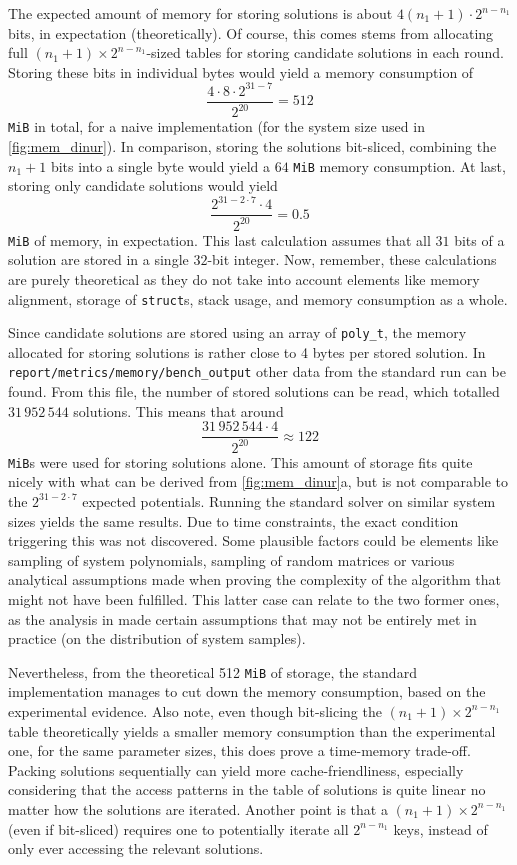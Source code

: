The expected amount of memory for storing solutions is about $4(n_1 + 1) \cdot 2^{n - n_1}$ bits, in expectation (theoretically). Of course, this comes stems from allocating full $(n_1 + 1) \times 2^{n - n_1}$-sized tables for storing candidate solutions in each round. Storing these bits in individual bytes would yield a memory consumption of 
$$
    \frac{4 \cdot 8 \cdot 2^{31 - 7}}{2^{20}} = 512
$$
\texttt{MiB} in total, for a naive implementation (for the system size used in \cref{fig:mem_dinur}). In comparison, storing the solutions bit-sliced, combining the $n_1 + 1$ bits into a single byte would yield a $64$ \texttt{MiB} memory consumption. At last, storing only candidate solutions would yield
$$
    \frac{2^{31 - 2 \cdot 7} \cdot 4}{2^{20}} = 0.5
$$
\texttt{MiB} of memory, in expectation. This last calculation assumes that all $31$ bits of a solution are stored in a single $32$-bit integer. Now, remember, these calculations are purely theoretical as they do not take into account elements like memory alignment, storage of \texttt{struct}s, stack usage, and memory consumption as a whole.

Since candidate solutions are stored using an array of \texttt{poly\_t}, the memory allocated for storing solutions is rather close to 4 bytes per stored solution. In \texttt{report/metrics/memory/bench\_output} other data from the standard run can be found. From this file, the number of stored solutions can be read, which totalled $31\,952\,544$ solutions. This means that around
$$
    \frac{31\,952\,544 \cdot 4}{2^{20}} \approx 122
$$
\texttt{MiB}s were used for storing solutions alone. This amount of storage fits quite nicely with what can be derived from \cref{fig:mem_dinur}a, but is not comparable to the $2^{31 - 2 \cdot 7}$ expected potentials. Running the standard solver on similar system sizes yields the same results. Due to time constraints, the exact condition triggering this was not discovered. Some plausible factors could be elements like sampling of system polynomials, sampling of random matrices or various analytical assumptions made when proving the complexity of the algorithm that might not have been fulfilled. This latter case can relate to the two former ones, as the analysis in \cite{eurocrypt-2021-30841} made certain assumptions that may not be entirely met in practice (on the distribution of system samples).

Nevertheless, from the theoretical 512 \texttt{MiB} of storage, the standard implementation manages to cut down the memory consumption, based on the experimental evidence. Also note, even though bit-slicing the $(n_1 + 1) \times 2^{n - n_1}$ table theoretically yields a smaller memory consumption than the experimental one, for the same parameter sizes, this does prove a time-memory trade-off. Packing solutions sequentially can yield more cache-friendliness, especially considering that the access patterns in the table of solutions is quite linear no matter how the solutions are iterated. Another point is that a $(n_1 + 1) \times 2^{n - n_1}$ (even if bit-sliced) requires one to potentially iterate all $2^{n - n_1}$ keys, instead of only ever accessing the relevant solutions.

